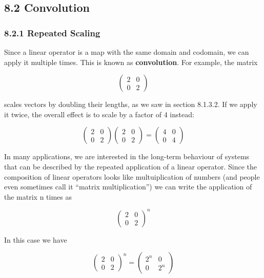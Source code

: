 \documentclass[oneside,english]{amsbook}
\numberwithin{section}{chapter}
\theoremstyle{plain}
\theoremstyle{definition}
\begin{document}
\subsection{8.2 Convolution}\label{convolution}

\subsubsection{8.2.1 Repeated Scaling}\label{repeated-scaling}

Since a linear operator is a map with the same domain and codomain, we
can apply it multiple times. This is known as \textbf{convolution}. For
example, the matrix

\[\begin{pmatrix}
	2 & 0 \\
	0 & 2
\end{pmatrix}\]

scales vectors by doubling their lengths, as we saw in section 8.1.3.2.
If we apply it twice, the overall effect is to scale by a factor of 4
instead:

\[\begin{pmatrix}
	2 & 0 \\
	0 & 2
\end{pmatrix}\begin{pmatrix}
	2 & 0 \\
	0 & 2
\end{pmatrix} = \begin{pmatrix}
	4 & 0 \\
	0 & 4
\end{pmatrix}\]

In many applications, we are interested in the long-term behaviour of
systems that can be described by the repeated application of a linear
operator. Since the composition of linear operators looks like
multuiplication of numbers (and people even sometimes call it ``matrix
multiplication'') we can write the application of the matrix n times as

\[\begin{pmatrix}
	2 & 0 \\
	0 & 2
\end{pmatrix}^{n}\]

In this case we have

\[\begin{pmatrix}
	2 & 0 \\
	0 & 2
\end{pmatrix}^{n} = \begin{pmatrix}
	2^{n} & 0 \\
	0 & 2^{n}
\end{pmatrix}\]
\end{document}
